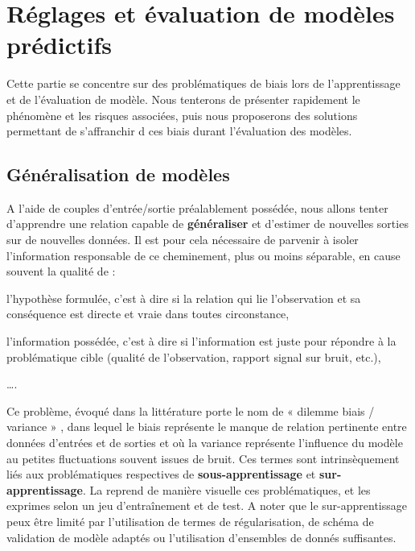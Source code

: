 \clearpage

\section{Réglages et évaluation de modèles prédictifs}
Cette partie se concentre sur des problématiques de biais lors de l'apprentissage et de l'évaluation de modèle. Nous tenterons de présenter rapidement le phénomène et les risques associées, puis nous proposerons des solutions permettant de s'affranchir d ces biais durant l'évaluation des modèles.\par

\subsection{Généralisation de modèles}
\label{subsec:generalized_models}
A l'aide de couples d'entrée/sortie préalablement possédée, nous allons tenter d’apprendre une relation capable de \textbf{généraliser} et d’estimer de nouvelles sorties sur de nouvelles données. Il est pour cela nécessaire de parvenir à isoler l'information responsable de ce cheminement, plus ou moins séparable, en cause souvent la qualité de :
\begin{inlinerate}
    \item l'hypothèse formulée, c'est à dire si la relation qui lie l'observation et sa conséquence est directe et vraie dans toutes circonstance,
    \item l'information possédée, c'est à dire si l'information est juste pour répondre à la problématique cible (qualité de l'observation, rapport signal sur bruit, etc.),
    \item \ldots.
\end{inlinerate}\par 

Ce problème, évoqué dans la littérature porte le nom de « dilemme biais / variance » , dans lequel le biais représente le manque de relation pertinente entre données d’entrées et de sorties et où la variance représente l’influence du modèle au petites fluctuations souvent issues de bruit. Ces termes sont intrinsèquement liés aux problématiques respectives de \textbf{sous-apprentissage} et \textbf{sur-apprentissage}. La  reprend de manière visuelle ces problématiques, et les exprimes selon un jeu d’entraînement et de test. A noter que le sur-apprentissage peux être limité par l’utilisation de termes de régularisation, de schéma de validation de modèle adaptés ou l’utilisation d’ensembles de donnés suffisantes.\par
 
